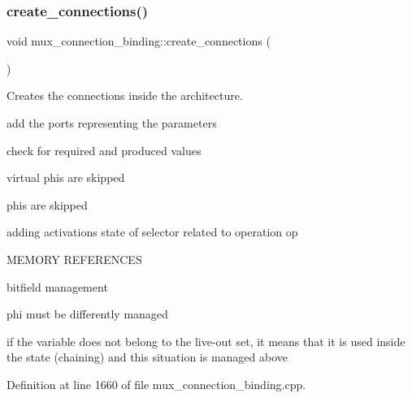 \subsubsection{\texorpdfstring{create\+\_\+connections()}{create\_connections()}}
{\footnotesize\ttfamily void mux\+\_\+connection\+\_\+binding\+::create\+\_\+connections (\begin{DoxyParamCaption}{ }\end{DoxyParamCaption})}



Creates the connections inside the architecture. 

add the ports representing the parameters

check for required and produced values

virtual phis are skipped

phis are skipped

adding activation\textquotesingle{}s state of selector related to operation op

M\+E\+M\+O\+RY R\+E\+F\+E\+R\+E\+N\+C\+ES

bitfield management

phi must be differently managed

if the variable does not belong to the live-\/out set, it means that it is used inside the state (chaining) and this situation is managed above 

Definition at line 1660 of file mux\+\_\+connection\+\_\+binding.\+cpp.



